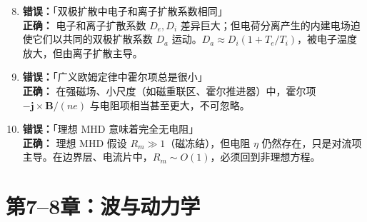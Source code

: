 \documentclass[12pt,a4paper,openany,oneside]{book}
\newcommand{\vect}[1]{\bm{#1}}
\begin{document}
\begin{warning}{}{}
\begin{enumerate}
\setcounter{enumi}{7}
\item \textbf{错误：}「双极扩散中电子和离子扩散系数相同」\\
\textbf{正确：} 电子和离子扩散系数 $D_e, D_i$ 差异巨大；但电荷分离产生的内建电场迫使它们以共同的双极扩散系数 $D_a$ 运动。$D_a\approx D_i(1+T_e/T_i)$，被电子温度放大，但由离子扩散主导。

\item \textbf{错误：}「广义欧姆定律中霍尔项总是很小」\\
\textbf{正确：} 在强磁场、小尺度（如磁重联区、霍尔推进器）中，霍尔项 $-\vect{j}\times\vect{B}/(ne)$ 与电阻项相当甚至更大，不可忽略。

\item \textbf{错误：}「理想 MHD 意味着完全无电阻」\\
\textbf{正确：} 理想 MHD 假设 $R_m\gg 1$（磁冻结），但电阻 $\eta$ 仍然存在，只是对流项主导。在边界层、电流片中，$R_m\sim O(1)$，必须回到非理想方程。
\end{enumerate}
\end{warning}


\section{第7--8章：波与动力学}
\end{document}
